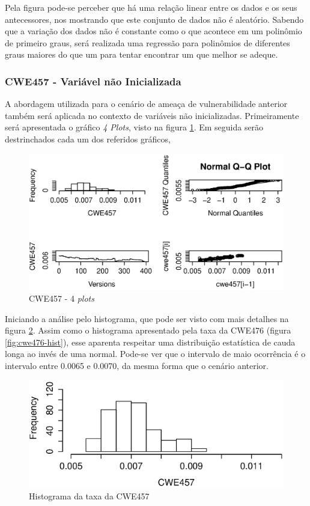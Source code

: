 Pela figura pode-se perceber que há uma relação linear entre os dados e os seus
antecessores, nos mostrando que este conjunto de dados não é aleatório. Sabendo
que a variação dos dados não é constante como o que acontece em um polinômio de
primeiro graus, será realizada uma regressão para polinômios de diferentes graus
maiores do que um para tentar encontrar um que melhor se adeque.


\subsubsection{CWE457 - Variável não Inicializada}

A abordagem utilizada para o cenário de ameaça de vulnerabilidade anterior
também será aplicada no contexto de variáveis não inicializadas. Primeiramente
será apresentada o gráfico \textit{4 Plots}, visto na figura
\ref{fig:cwe457-4-plot}. Em seguida serão destrinchados cada um dos referidos
gráficos,

\begin{figure}[h]
  \centering
  \includegraphics[width=1.0\textwidth]
      {figuras/cwe457-4-plot.eps}
      \caption{CWE457 - 4 \textit{plots}}
  \label{fig:cwe457-4-plot}
\end{figure}

Iniciando a análise pelo histograma, que pode ser visto com mais detalhes na
figura \ref{fig:cwe457-hist}. Assim como o histograma apresentado pela taxa da
CWE476 (figura \ref{fig:cwe476-hist}), esse aparenta respeitar uma distribuição
estatística de cauda longa ao invés de uma normal. Pode-se ver que o intervalo
de maio ocorrência é o intervalo entre 0.0065 e 0.0070, da mesma forma que o
cenário anterior.

\begin{figure}[h]
  \centering
  \includegraphics[width=1.0\textwidth]
      {figuras/cwe457-hist.eps}
      \caption{Histograma da taxa da CWE457}
  \label{fig:cwe457-hist}
\end{figure}

